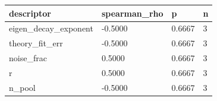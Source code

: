 \begin{tabular}{llll}
\hline
descriptor & spearman\_rho & p & n \\
\hline
eigen\_decay\_exponent & -0.5000 & 0.6667 & 3 \\
theory\_fit\_err & -0.5000 & 0.6667 & 3 \\
noise\_frac & 0.5000 & 0.6667 & 3 \\
r & 0.5000 & 0.6667 & 3 \\
n\_pool & -0.5000 & 0.6667 & 3 \\
\hline
\end{tabular}
